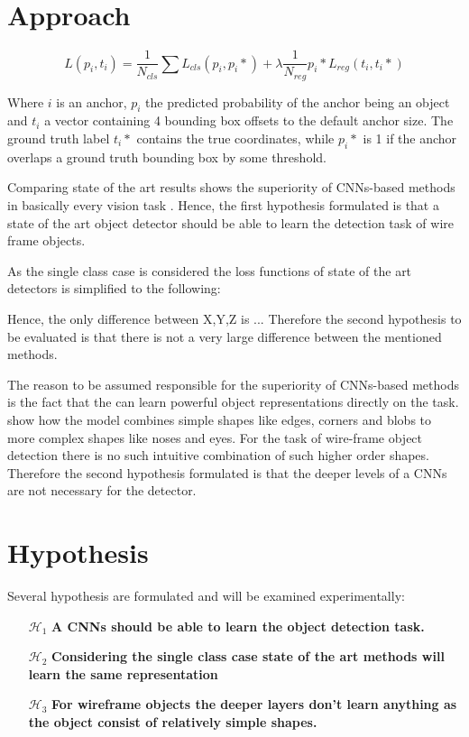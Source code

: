 

\section{Approach}
\label{sec:object_detection:approach}
	$$
	L({p_i},{t_i}) = \frac{1}{N_{cls}} \sum L_{cls}(p_i,p_i*) + \lambda \frac{1}{N_{reg}} p_i* L_{reg}(t_i,t_i*)
	$$
	
	Where $i$ is an anchor, $p_i$ the predicted probability of the anchor being an object and $t_i$ a vector containing 4 bounding box offsets to the default anchor size. The ground truth label $t_i*$ contains the true coordinates, while $p_i*$ is 1 if the anchor overlaps a ground truth bounding box by some threshold. 


Comparing state of the art results shows the superiority of \acp{CNN}-based methods in basically every vision task . Hence, the first hypothesis formulated is that a state of the art object detector should be able to learn the detection task of wire frame objects. 

As the single class case is considered the loss functions of state of the art detectors is simplified to the following:


Hence, the only difference between X,Y,Z is ...
Therefore the second hypothesis to be evaluated is that there is not a very large difference between the mentioned methods.


The reason to be assumed responsible for the superiority of \acp{CNN}-based methods is the fact that the can learn powerful object representations directly on the task.  show how the model combines simple shapes like edges, corners and blobs to more complex shapes like noses and eyes. For the task of wire-frame object detection there is no such intuitive combination of such higher order shapes. Therefore the second hypothesis formulated is that the deeper levels of a \acp{CNN} are not necessary for the detector.

\section{Hypothesis}

\label{sec:object_detection:hypothesis}
Several hypothesis are formulated and will be examined experimentally:
\begin{enumerate}
	\item[$\mathcal{H}_1$] \textbf{A \acp{CNN} should be able to learn the object detection task.}
	\item[$\mathcal{H}_2$] \textbf{Considering the single class case state of the art methods will learn the same representation}
	\item[$\mathcal{H}_3$] \textbf{For wireframe objects the deeper layers don't learn anything as the object consist of relatively simple shapes.}
	
\end{enumerate}
\newpage
